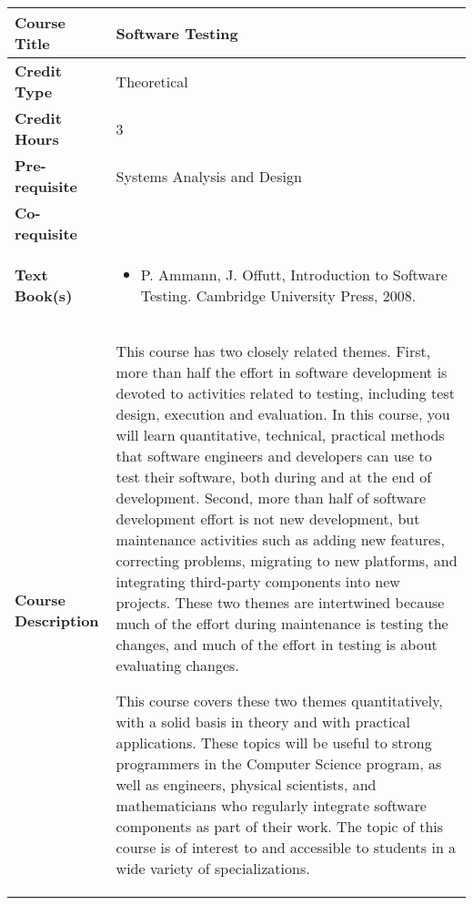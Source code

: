 \documentclass[11pt]{article}
\begin{document}
\begin{table}[h!]
\begin{tabular}{|l|l|}
\hline
\textbf{Course Title}       &   Software Testing \\ \hline
\textbf{Credit Type}        &  Theoretical \\ \hline
\textbf{Credit Hours}       &  3  \\ \hline
\textbf{Pre-requisite}       &  Systems Analysis and Design \\ \hline
\textbf{Co-requisite}       &  \\ \hline
\textbf{Text Book(s)}       & \begin{minipage}{.70\textwidth}
\begin{itemize} \itemsep-0.4em
	\vspace{3mm}
	\item P. Ammann, J. Offutt, Introduction to Software Testing. Cambridge University Press, 2008.
	\vspace{3mm}
\end{itemize}
\end{minipage}\\ \hline
\textbf{Course Description} & \begin{minipage}{.70\textwidth}
\vspace{3mm}
This course has two closely related themes. First, more than half the effort in software development is devoted to activities related to testing, including test design, execution and evaluation. In this course, you will learn quantitative, technical, practical methods that software engineers and developers can use to test their software, both during and at the end of development. Second, more than half of software development effort is not new development, but maintenance activities such as adding new features, correcting problems, migrating to new platforms, and integrating third-party components into new projects. These two themes are intertwined because much of the effort during maintenance is testing the changes, and much of the effort in testing is about evaluating changes. 

This course covers these two themes quantitatively, with a solid basis in theory and with practical applications. These topics will be useful to strong programmers in the Computer Science program, as well as engineers, physical scientists, and mathematicians who regularly integrate software components as part of their work. The topic of this course is of interest to and accessible to students in a wide variety of specializations. 
\vspace{3mm}
\end{minipage} \\ \hline
\end{tabular}
\end{table}
\end{document}
